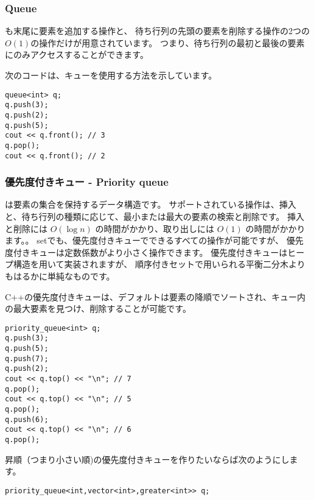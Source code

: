 \subsubsection{Queue}


 も末尾に要素を追加する操作と、
待ち行列の先頭の要素を削除する操作の2つの$O(1)$の操作だけが用意されています。
つまり、待ち行列の最初と最後の要素にのみアクセスすることができます。

次のコードは、キューを使用する方法を示しています。

\begin{lstlisting}
queue<int> q;
q.push(3);
q.push(2);
q.push(5);
cout << q.front(); // 3
q.pop();
cout << q.front(); // 2
\end{lstlisting}

\subsubsection{優先度付きキュー - Priority queue}


は要素の集合を保持するデータ構造です。
サポートされている操作は、挿入と、待ち行列の種類に応じて、最小または最大の要素の検索と削除です。
挿入と削除には $O(\log n)$ の時間がかかり、取り出しには $O(1)$ の時間がかかります。。
setでも、優先度付きキューでできるすべての操作が可能ですが、
優先度付きキューは定数係数がより小さく操作できます。
優先度付きキューはヒープ構造を用いて実装されますが、
順序付きセットで用いられる平衡二分木よりもはるかに単純なものです。

\begin{samepage}

C++の優先度付きキューは、デフォルトは要素の降順でソートされ、キュー内の最大要素を見つけ、削除することが可能です。
\begin{lstlisting}
priority_queue<int> q;
q.push(3);
q.push(5);
q.push(7);
q.push(2);
cout << q.top() << "\n"; // 7
q.pop();
cout << q.top() << "\n"; // 5
q.pop();
q.push(6);
cout << q.top() << "\n"; // 6
q.pop();
\end{lstlisting}
\end{samepage}

昇順（つまり小さい順)の優先度付きキューを作りたいならば次のようにします。
\begin{lstlisting}
priority_queue<int,vector<int>,greater<int>> q;
\end{lstlisting}

